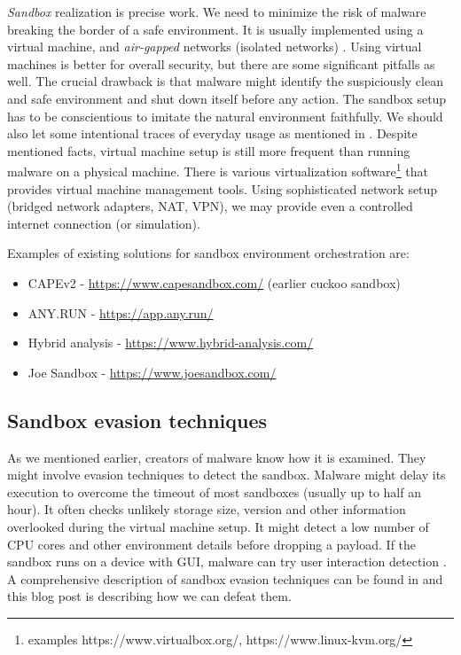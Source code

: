 \emph{Sandbox} realization is precise work. We need to minimize the risk of malware breaking the border of a safe environment. It is usually implemented using a virtual machine, and \emph{air-gapped} networks (isolated networks) \cite{Sikorski2012}. Using virtual machines is better for overall security, but there are some significant pitfalls as well. The crucial drawback is that malware might identify the suspiciously clean and safe environment and shut down itself before any action. The sandbox setup has to be conscientious to imitate the natural environment faithfully. We should also let some intentional traces of everyday usage as mentioned in \cite{CAPESand75:online}. Despite mentioned facts, virtual machine setup is still more frequent than running malware on a physical machine. There is various virtualization software\footnote{examples https://www.virtualbox.org/, https://www.linux-kvm.org/} that provides virtual machine management tools. Using sophisticated network setup (bridged network adapters, NAT, VPN), we may provide even a controlled internet connection (or simulation).

Examples of existing solutions for sandbox environment orchestration are:
\begin{itemize}
  \item CAPEv2 - \url{https://www.capesandbox.com/} (earlier cuckoo sandbox)
  \item ANY.RUN - \url{https://app.any.run/}
  \item Hybrid analysis - \url{https://www.hybrid-analysis.com/}
  \item Joe Sandbox - \url{https://www.joesandbox.com/}
\end{itemize}

\subsection{Sandbox evasion techniques}
As we mentioned earlier, creators of malware know how it is examined. They might involve evasion techniques to detect the sandbox. Malware might delay its execution to overcome the timeout of most sandboxes (usually up to half an hour). It often checks unlikely storage size, version and other information overlooked during the virtual machine setup. It might detect a low number of CPU cores and other environment details before dropping a payload. If the sandbox runs on a device with GUI, malware can try user interaction detection \cite{Evolutio45:online}. A comprehensive description of sandbox evasion techniques can be found in \cite{Afianian2018} and this blog post \cite{Chailytko2019} is describing how we can defeat them.

